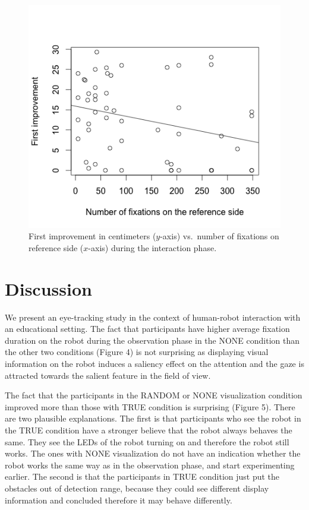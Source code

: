 \documentclass{sig-alternate}
\begin{document}
\begin{figure}[h!]
    \centering
    \includegraphics[width=0.8\linewidth]{res4}
    \caption{First improvement in centimeters ($y$-axis) vs.~number of fixations
    on reference side ($x$-axis) during the interaction phase.}
    \label{res4}
\end{figure}


\section{Discussion}

We present an eye-tracking study in the context of human-robot
interaction with an educational setting. The fact that participants have
higher average fixation duration on the robot during the observation
phase in the NONE condition than the other two conditions (Figure 4) is
not surprising as displaying visual information on the robot induces a
saliency effect on the attention and the gaze is attracted towards the
salient feature in the field of view.

The fact that the participants in the RANDOM or NONE visualization
condition improved more than those with TRUE condition is surprising
(Figure 5). There are two plausible explanations. The first is that
participants who see the robot in the TRUE condition have a stronger
believe that the robot always behaves the same. They see the LEDs of the
robot turning on and therefore the robot still works. The ones with NONE
visualization do not have an indication whether the robot works the same
way as in the observation phase, and start experimenting earlier. The
second is that the participants in TRUE condition just put the obstacles
out of detection range, because they could see different display
information and concluded therefore it may behave differently.
\end{document}
